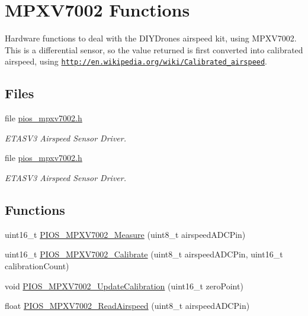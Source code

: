 \hypertarget{group___p_i_o_s___m_p_x_v7002}{\section{\-M\-P\-X\-V7002 \-Functions}
\label{group___p_i_o_s___m_p_x_v7002}
}


\-Hardware functions to deal with the \-D\-I\-Y\-Drones airspeed kit, using \-M\-P\-X\-V7002. \-This is a differential sensor, so the value returned is first converted into calibrated airspeed, using \href{http://en.wikipedia.org/wiki/Calibrated_airspeed}{\tt http\-://en.\-wikipedia.\-org/wiki/\-Calibrated\-\_\-airspeed}.  


\subsection*{\-Files}
\begin{DoxyCompactItemize}
\item 
file \hyperlink{pios__mpxv7002_8h}{pios\-\_\-mpxv7002.\-h}
\begin{DoxyCompactList}\small\item\em \-E\-T\-A\-S\-V3 \-Airspeed \-Sensor \-Driver. \end{DoxyCompactList}\item 
file \hyperlink{pios__mpxv7002_8h}{pios\-\_\-mpxv7002.\-h}
\begin{DoxyCompactList}\small\item\em \-E\-T\-A\-S\-V3 \-Airspeed \-Sensor \-Driver. \end{DoxyCompactList}\end{DoxyCompactItemize}
\subsection*{\-Functions}
\begin{DoxyCompactItemize}
\item 
uint16\-\_\-t \hyperlink{group___p_i_o_s___m_p_x_v7002_ga705251be57f475b27e6b587ab5bc9e92}{\-P\-I\-O\-S\-\_\-\-M\-P\-X\-V7002\-\_\-\-Measure} (uint8\-\_\-t airspeed\-A\-D\-C\-Pin)
\item 
uint16\-\_\-t \hyperlink{group___p_i_o_s___m_p_x_v7002_ga520aa61ca1d841e66d5e882a03d36d53}{\-P\-I\-O\-S\-\_\-\-M\-P\-X\-V7002\-\_\-\-Calibrate} (uint8\-\_\-t airspeed\-A\-D\-C\-Pin, uint16\-\_\-t calibration\-Count)
\item 
void \hyperlink{group___p_i_o_s___m_p_x_v7002_ga41b25e0b6038d2a270e131d793dfcbfa}{\-P\-I\-O\-S\-\_\-\-M\-P\-X\-V7002\-\_\-\-Update\-Calibration} (uint16\-\_\-t zero\-Point)
\item 
float \hyperlink{group___p_i_o_s___m_p_x_v7002_ga4b633792da46f4b0fe82dcd3d17f416c}{\-P\-I\-O\-S\-\_\-\-M\-P\-X\-V7002\-\_\-\-Read\-Airspeed} (uint8\-\_\-t airspeed\-A\-D\-C\-Pin)
\end{DoxyCompactItemize}


